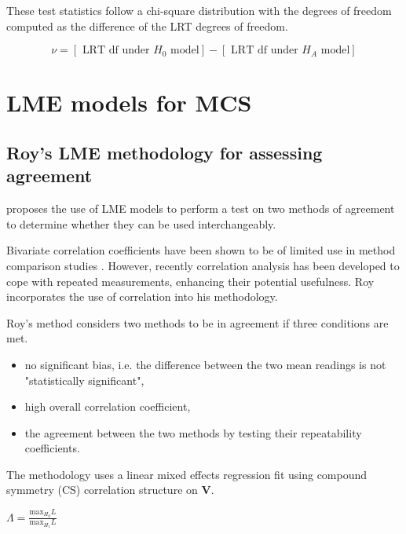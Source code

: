 \documentclass[12pt, a4paper]{report}
\theoremstyle{plain}
\theoremstyle{definition}
\theoremstyle{remark}
\begin{document}
These test statistics follow a chi-square distribution with the degrees of freedom computed as the difference of the LRT degrees of freedom.

\begin{equation}
\nu = [\mbox{ LRT df under }H_{0} \mbox{ model}] - [\mbox{ LRT df under }H_{A} \mbox{ model}]
\end{equation}







\chapter{LME models for MCS}
\section{Roy's LME methodology for assessing agreement}

\citet{ARoy2009} proposes the use of LME models to perform a test
on two methods of agreement to determine whether they can be used
interchangeably.

Bivariate correlation coefficients have been shown to be of
limited use in method comparison studies \citep{BA86}. However,
recently correlation analysis has been developed to cope with
repeated measurements, enhancing their potential usefulness. Roy
incorporates the use of correlation into his methodology.

Roy's method considers two methods to be in agreement if three
conditions are met.

\begin{itemize}
	\item no significant bias, i.e. the difference between the two
	mean readings is not "statistically significant",
	
	\item high overall correlation coefficient,
	
	\item the agreement between the two methods by testing their
	repeatability coefficients.
	
\end{itemize}

The methodology uses a linear mixed effects regression fit using
compound symmetry (CS) correlation structure on \textbf{V}.


$\Lambda = \frac{\mbox{max}_{H_{0}}L}{\mbox{max}_{H_{1}}L}$
\end{document}
